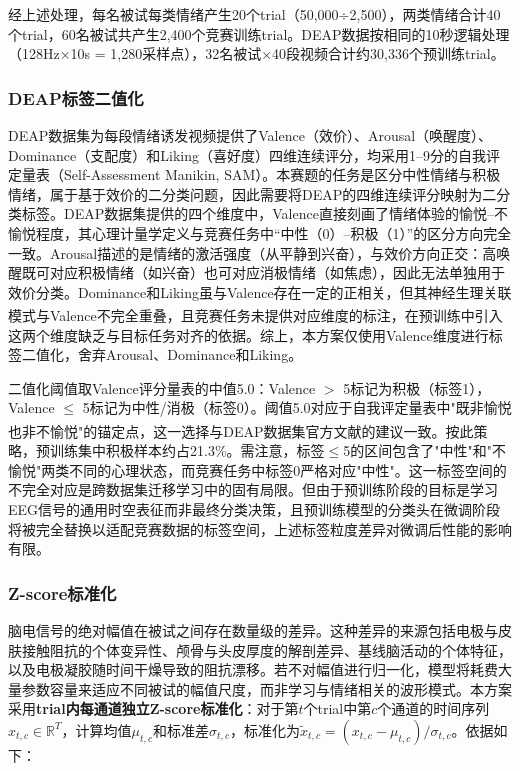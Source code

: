 \documentclass[UTF8,zihao=-4,fontset=windows]{ctexart}
\let\oldcite\cite
\renewcommand{\cite}[1]{\textsuperscript{\oldcite{#1}}}
\numberwithin{equation}{section}
\numberwithin{figure}{section}
\numberwithin{table}{section}
\begin{document}
经上述处理，每名被试每类情绪产生20个trial（50,000÷2,500），两类情绪合计40个trial，60名被试共产生2,400个竞赛训练trial。DEAP数据按相同的10秒逻辑处理（128Hz×10s = 1,280采样点），32名被试×40段视频合计约30,336个预训练trial。

\subsubsection{DEAP标签二值化}

DEAP数据集为每段情绪诱发视频提供了Valence（效价）、Arousal（唤醒度）、Dominance（支配度）和Liking（喜好度）四维连续评分，均采用1--9分的自我评定量表（Self-Assessment Manikin, SAM）。本赛题的任务是区分中性情绪与积极情绪，属于基于效价的二分类问题，因此需要将DEAP的四维连续评分映射为二分类标签。DEAP数据集提供的四个维度中，Valence直接刻画了情绪体验的愉悦--不愉悦程度，其心理计量学定义与竞赛任务中“中性（0）--积极（1）”的区分方向完全一致。Arousal描述的是情绪的激活强度（从平静到兴奋），与效价方向正交：高唤醒既可对应积极情绪（如兴奋）也可对应消极情绪（如焦虑），因此无法单独用于效价分类。Dominance和Liking虽与Valence存在一定的正相关，但其神经生理关联模式与Valence不完全重叠\cite{deap}，且竞赛任务未提供对应维度的标注，在预训练中引入这两个维度缺乏与目标任务对齐的依据。综上，本方案仅使用Valence维度进行标签二值化，舍弃Arousal、Dominance和Liking。

二值化阈值取Valence评分量表的中值5.0：Valence $>$ 5标记为积极（标签1），Valence $\leq$ 5标记为中性/消极（标签0）。阈值5.0对应于自我评定量表中"既非愉悦也非不愉悦"的锚定点，这一选择与DEAP数据集官方文献的建议一致\cite{deap}。按此策略，预训练集中积极样本约占21.3\%。需注意，标签$\leq$5的区间包含了"中性"和"不愉悦"两类不同的心理状态，而竞赛任务中标签0严格对应"中性"。这一标签空间的不完全对应是跨数据集迁移学习中的固有局限。但由于预训练阶段的目标是学习EEG信号的通用时空表征而非最终分类决策，且预训练模型的分类头在微调阶段将被完全替换以适配竞赛数据的标签空间，上述标签粒度差异对微调后性能的影响有限。

\subsubsection{Z-score标准化}

脑电信号的绝对幅值在被试之间存在数量级的差异。这种差异的来源包括电极与皮肤接触阻抗的个体变异性、颅骨与头皮厚度的解剖差异、基线脑活动的个体特征，以及电极凝胶随时间干燥导致的阻抗漂移。若不对幅值进行归一化，模型将耗费大量参数容量来适应不同被试的幅值尺度，而非学习与情绪相关的波形模式。本方案采用\textbf{trial内每通道独立Z-score标准化}：对于第$t$个trial中第$c$个通道的时间序列$x_{t,c} \in \mathbb{R}^{T}$，计算均值$\mu_{t,c}$和标准差$\sigma_{t,c}$，标准化为$\tilde{x}_{t,c} = (x_{t,c} - \mu_{t,c}) / \sigma_{t,c}$。依据如下：
\end{document}
